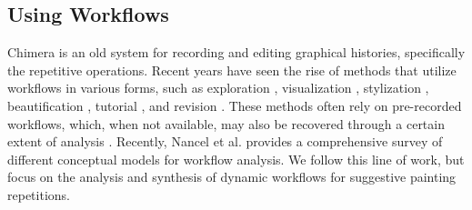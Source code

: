 \subsection{Using Workflows}
Chimera \cite{bib1} is an old system for recording and editing graphical histories, specifically the repetitive operations. Recent years have seen the rise of methods that utilize workflows in various forms, such as exploration \cite{bib1}, visualization  \cite{bib1} \cite{bib1} \cite{bib1} \cite{bib1}, stylization \cite{bib1}, beautification \cite{bib1}, tutorial  \cite{bib1} \cite{bib1}, and revision \cite{bib1}. These methods often rely on pre-recorded workflows, which, when not available, may also be recovered through a certain extent of analysis  \cite{bib1} \cite{bib1} \cite{bib1} \cite{bib1}. Recently, Nancel et al. \cite{bib1} provides a comprehensive survey of different conceptual models for workflow analysis.
We follow this line of work, but focus on the analysis and synthesis of dynamic workflows for suggestive painting repetitions.



